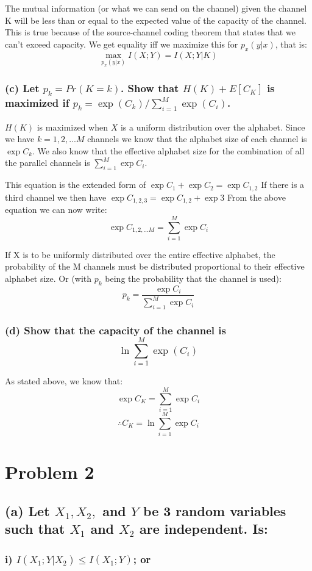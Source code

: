 \documentclass[11pt, oneside]{book}   	%
\begin{document}
The mutual information (or what we can send on the channel) given the channel K will be less than or equal to the expected value of the capacity of the channel.  This is true because of the source-channel coding theorem that states that we can't exceed capacity.  We get equality iff we maximize this for $p_x(y|x)$, that is: $$\max_{p_x(y|x)} I(X;Y)=I(X;Y|K)$$

\subsubsection{(c) Let $p_k = Pr(K=k)$.  Show that $H(K)+E[C_K]$ is maximized if $p_k=\exp(C_k)/ \sum^M_{i=1}\exp(C_i)$.}

$H(K)$ is maximized when $X$ is a uniform distribution over the alphabet.  Since we have $k=1,2,...M$ channels we know that the alphabet size of each channel is $\exp{C_k}$.  We also know that the effective alphabet size for the combination of all the parallel channels is $\sum^M_{i=1}\exp{C_i}$.

This equation is the extended form of $\exp{C_1}+\exp{C_2}=\exp{C_{1,2}}$  If there is a third channel we then have $\exp{C_{1,2,3}}=\exp{C_{1,2}}+\exp{3}$  From the above equation we can now write:
$$\exp{C_{1,2,...M}} = \sum^M_{i=1} \exp{C_i}$$

If X is to be uniformly distributed over the entire effective alphabet, the probability of the M channels must be distributed proportional to their effective alphabet size.  Or (with $p_k$ being the probability that the channel is used):
$$p_k = \frac{\exp{C_i}}{\sum^M_{i=1}\exp{C_i}}$$

\subsubsection{(d) Show that the capacity of the channel is $$\ln{ \sum^M_{i=1}\exp(C_i)}$$}

As stated above, we know that:
$$\exp{C_K}=\sum^M_{i=1}\exp{C_i}$$
$$\therefore C_K = \ln{\sum^M_{i=1}\exp{C_i}}$$

\section{Problem 2}
\subsection*{(a) Let $X_1,X_2,$ and $Y$ be 3 random variables such that $X_1$ and $X_2$ are independent. Is:}
\subsubsection{i)   $I(X_1;Y|X_2) \leq I(X_1;Y)$; or}
\end{document}

